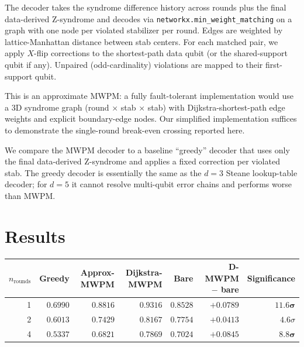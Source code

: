 \documentclass[11pt,letterpaper]{article}
\begin{document}
The decoder takes the syndrome difference history across rounds plus the final data-derived Z-syndrome and decodes via \texttt{networkx.min\_weight\_matching} on a graph with one node per violated stabilizer per round. Edges are weighted by lattice-Manhattan distance between stab centers. For each matched pair, we apply $X$-flip corrections to the shortest-path data qubit (or the shared-support qubit if any). Unpaired (odd-cardinality) violations are mapped to their first-support qubit.

This is an approximate MWPM: a fully fault-tolerant implementation would use a 3D syndrome graph (round × stab × stab) with Dijkstra-shortest-path edge weights and explicit boundary-edge nodes. Our simplified implementation suffices to demonstrate the single-round break-even crossing reported here.

We compare the MWPM decoder to a baseline ``greedy'' decoder that uses only the final data-derived Z-syndrome and applies a fixed correction per violated stab. The greedy decoder is essentially the same as the $d = 3$ Steane lookup-table decoder; for $d = 5$ it cannot resolve multi-qubit error chains and performs worse than MWPM.

\section{Results}

\begin{center}
\begin{tabular}{rrrrrrr}
\toprule
$n_{\mathrm{rounds}}$ & Greedy & Approx-MWPM & \textbf{Dijkstra-MWPM} & Bare & D-MWPM $-$ bare & Significance \\
\midrule
1 & $0.6990$ & $0.8816$ & $\bm{0.9316}$ & $0.8528$ & $\bm{+0.0789}$ & $\bm{11.6\sigma}$ \\
2 & $0.6013$ & $0.7429$ & $\bm{0.8167}$ & $0.7754$ & $\bm{+0.0413}$ & $4.6\sigma$ \\
4 & $0.5337$ & $0.6821$ & $\bm{0.7869}$ & $0.7024$ & $\bm{+0.0845}$ & $\bm{8.8\sigma}$ \\
\bottomrule
\end{tabular}
\end{center}
\end{document}
